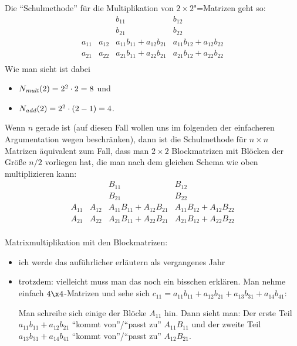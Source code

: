 Die "`Schulmethode"' für die Multiplikation von $2\times 2$"=Matrizen
geht so:
\[
\begin{array}{cc|cc}
  & & b_{11} & b_{12} \\
  & & b_{21} & b_{22} \\ \hline
  a_{11} & a_{12} & a_{11}b_{11} + a_{12}b_{21}& a_{11}b_{12} + a_{12}b_{22}\\
  a_{21} & a_{22} & a_{21}b_{11} + a_{22}b_{21}& a_{21}b_{12} + a_{22}b_{22} \\
\end{array}
\]
%
Wie man sieht ist dabei
\begin{itemize}
\item $N_{\mathit{mult}}(2) = 2^2 \cdot 2 = 8$ und
\item $N_{\mathit{add}}(2) = 2^2\cdot(2-1) = 4$.
\end{itemize}
%
Wenn $n$ gerade ist (auf diesen Fall wollen uns im folgenden der
einfacheren Argumentation wegen beschränken), dann ist die
Schulmethode für $n\times n$ Matrizen äquivalent zum Fall, dass man
$2\times2$ Blockmatrizen mit Blöcken der Größe $n/2$ vorliegen hat,
die man nach dem gleichen Schema wie oben multiplizieren kann:
\[
\begin{array}{cc|cc}
  & & B_{11} & B_{12} \\
  & & B_{21} & B_{22} \\ \hline
  A_{11} & A_{12} & A_{11}B_{11} + A_{12}B_{21}& A_{11}B_{12} + A_{12}B_{22}\\
  A_{21} & A_{22} & A_{21}B_{11} + A_{22}B_{21}& A_{21}B_{12} + A_{22}B_{22} \\
\end{array}
\]
%
\begin{tutorium}
  Matrixmultiplikation mit den Blockmatrizen: 
  \begin{itemize}
  \item ich werde das auführlicher erläutern als vergangenes Jahr
  \item trotzdem: vielleicht muss man das noch ein bisschen
    erklären. Man nehme einfach $4\x 4$-Matrizen und sehe sich \zB
    $c_{11}=a_{11}b_{11} + a_{12}b_{21} + a_{13}b_{31} +
    a_{14}b_{41}$:

    Man schreibe sich einige der Blöcke $A_{11}$ \usw hin. Dann sieht
    man: Der erste Teil $a_{11}b_{11} + a_{12}b_{21}$ "`kommt
    von"'/"`passt zu"' $A_{11}B_{11}$ und der zweite Teil
    $a_{13}b_{31} + a_{14}b_{41}$ "`kommt von"'/"`passt zu"'
    $A_{12}B_{21}$.
  \end{itemize}
\end{tutorium}
